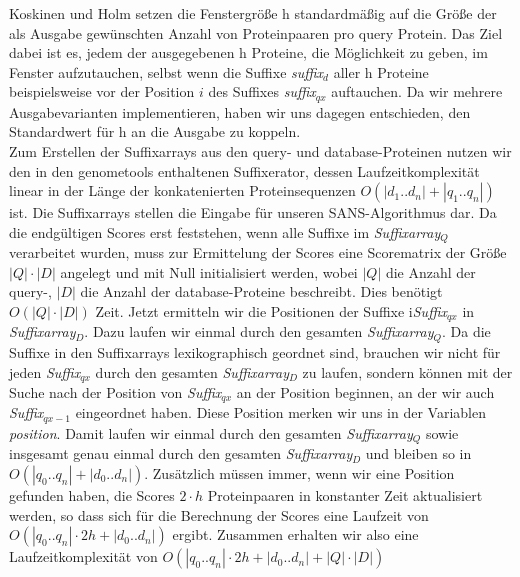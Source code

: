 \documentclass{article}
\begin{document}
Koskinen und Holm setzen die Fenstergröße h standardmäßig auf die Größe der als
Ausgabe gewünschten Anzahl von Proteinpaaren pro query Protein. 
Das Ziel dabei ist es, jedem der ausgegebenen h Proteine, die Möglichkeit zu
geben, im Fenster aufzutauchen, selbst wenn die Suffixe \emph{suffix$_{d}$}
aller h Proteine beispielsweise vor der Position $i$ des Suffixes
\emph{suffix$_{qx}$} auftauchen. 
Da wir mehrere Ausgabevarianten implementieren, haben wir uns dagegen entschieden, den Standardwert für h an die Ausgabe zu koppeln.\\
Zum Erstellen der Suffixarrays aus den query- und database-Proteinen nutzen wir
den in den genometools enthaltenen Suffixerator, dessen Laufzeitkomplexität
linear in der Länge der konkatenierten Proteinsequenzen $O(|d_1..d_n|+|q_1..q_n|)$ ist.
Die Suffixarrays stellen die Eingabe für unseren SANS-Algorithmus dar.
Da die endgültigen Scores erst feststehen, wenn alle Suffixe im
\emph{Suffixarray$_Q$}
verarbeitet wurden, muss zur Ermittelung der Scores eine Scorematrix der Größe
$|Q|\cdot|D|$ angelegt und mit Null initialisiert werden, wobei $|Q|$ die Anzahl
der query-, $|D|$ die Anzahl der database-Proteine beschreibt. Dies benötigt
$O(|Q|\cdot|D|)$ Zeit. Jetzt ermitteln wir die Positionen der Suffixe
i\emph{Suffix$_{qx}$} in \emph{Suffixarray$_D$}. Dazu laufen wir einmal durch
den gesamten \emph{Suffixarray$_Q$}. Da die Suffixe in den Suffixarrays
lexikographisch geordnet sind, brauchen wir nicht für jeden \emph{Suffix$_{qx}$}
durch den gesamten \emph{Suffixarray$_D$} zu laufen, sondern können mit der
Suche nach der Position von \emph{Suffix$_{qx}$} an der Position beginnen, an
der wir auch \emph{Suffix$_{qx-1}$} eingeordnet haben. Diese Position merken wir
uns in der Variablen \emph{position}. Damit laufen wir einmal durch den gesamten
\emph{Suffixarray$_Q$} sowie insgesamt genau einmal durch den gesamten
\emph{Suffixarray$_D$} und bleiben so in $O(|q_0..q_n| + |d_0..d_n|)$.
Zusätzlich müssen immer, wenn wir eine Position gefunden haben, die Scores $2
\cdot h$ Proteinpaaren in konstanter Zeit aktualisiert werden, so dass sich für
die Berechnung der Scores eine Laufzeit von ${O(|q_0..q_n|\cdot2h +
|d_0..d_n|)}$ ergibt. Zusammen erhalten wir also eine Laufzeitkomplexität von ${O(|q_0..q_n|\cdot2h + |d_0..d_n|+|Q|\cdot|D|)}$
\end{document}
